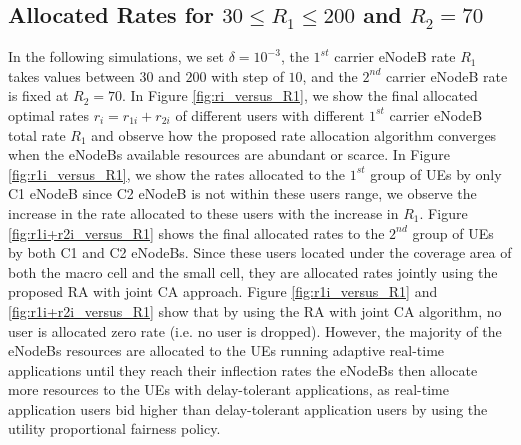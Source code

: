 \documentclass[journal]{IEEEtran} 		\usepackage{amsmath,amssymb}
\begin{document}
\subsection{Allocated Rates for $30\le R_1\le200$ and $R_2=70$}
In the following simulations, we set $\delta =10^{-3}$, the $1^{st}$ carrier eNodeB rate $R_1$ takes values between $30$ and $200$ with step of $10$, and the $2^{nd}$ carrier eNodeB rate is fixed at $R_2 = 70$. In Figure \ref{fig:ri_versus_R1}, we show the final allocated optimal rates $r_i=r_{1i}+r_{2i}$ of different users with different $1^{st}$ carrier eNodeB total rate $R_1$ and observe how the proposed rate allocation algorithm converges when the eNodeBs available resources are abundant or scarce. In Figure \ref{fig:r1i_versus_R1}, we show the rates allocated to the $1^{st}$ group of UEs by only C1 eNodeB since C2 eNodeB is not within these users range, we observe the increase in the rate allocated to these users with the increase in $R_1$. Figure \ref{fig:r1i+r2i_versus_R1} shows the final allocated rates to the $2^{nd}$ group of UEs by both C1 and C2 eNodeBs. Since these users located under the coverage area of both the macro cell and the small cell, they are allocated rates jointly using the proposed
RA with joint CA approach. Figure \ref{fig:r1i_versus_R1} and \ref{fig:r1i+r2i_versus_R1} show that by using the RA with joint CA algorithm, no user is allocated zero rate (i.e. no user is dropped). However, the majority of the eNodeBs resources are allocated to the UEs running adaptive real-time applications until they reach their inflection rates the eNodeBs then allocate more resources to the UEs with delay-tolerant applications, as real-time application users bid higher than delay-tolerant application users by using the utility proportional fairness policy.
\end{document}
